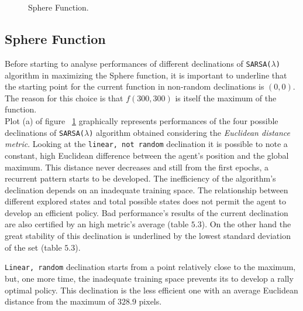 \begin{figure}[h!]
	\begin{center}
		\\
		 \\
		
	\end{center}
	\caption{
		Sphere Function.
	}
	\label{fig:ParabolicResults}
\end{figure}


\subsection{Sphere Function} Before starting to analyse performances of different declinations of {\tt SARSA($\lambda$)} algorithm in maximizing the Sphere function, it is important to underline that the starting point for the current function in non-random declinations is $(0, 0)$. The reason for this choice is that $f(300, 300)$ is itself the maximum of the function. \\

Plot (a) of figure ~\ref{fig:ParabolicResults} graphically represents performances of the four possible declinations of {\tt SARSA($\lambda$)} algorithm obtained considering the \textit{Euclidean distance metric}. Looking at the {\tt linear, not random} declination it is possible to note a constant, high Euclidean difference between the agent's position and the global maximum. This distance never decreases and still from the first epochs, a recurrent pattern starts to be developed. The inefficiency of the algorithm's declination depends on an inadequate training space. The relationship between different explored states and total possible states does not permit the agent to develop an efficient policy. Bad performance's results of the current declination are also certified by an high metric's average (table $5.3$). On the other hand the great stability of this declination is underlined by the lowest standard deviation of the set (table $5.3$).

{\tt Linear, random} declination starts from a point relatively close to the maximum, but, one more time, the inadequate training space prevents its to develop a rally optimal policy. This declination is the less efficient one with an average Euclidean distance from the maximum of $328.9$ pixels.

